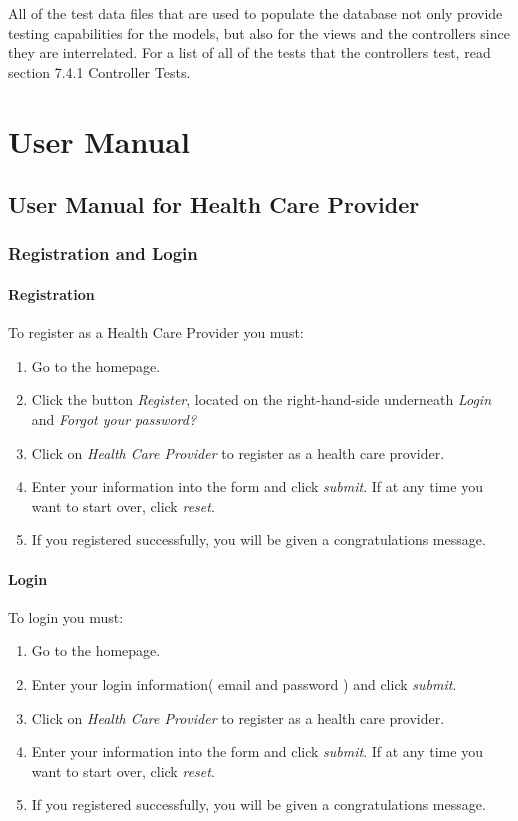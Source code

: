 \documentclass[12pt]{report}
\begin{document}
All of the test data files that are used to populate the database not only provide testing capabilities for the models, but also for the views and the controllers since they are interrelated.  For a list of all of the tests that the controllers test, read section 7.4.1 Controller Tests.


\part{User Manual}

\chapter{User Manual for Health Care Provider}
\section{Registration and Login}

\subsection{Registration}
To register as a Health Care Provider you must:
\begin{enumerate}
\item Go to the homepage.
\item Click the button \textit{Register}, located on the right-hand-side underneath \textit{Login} and \textit{Forgot your password?}
\item Click on \textit{Health Care Provider} to register as a health care provider.
\item Enter your information into the form and click \textit{submit}. If at any time you want to start over, click \textit{reset}.
\item If you registered successfully, you will be given a congratulations message.
\end{enumerate}

\subsection{Login}
To login you must:
\begin{enumerate}
\item Go to the homepage.
\item Enter your login information( email and password ) and click \textit{submit}.
\item Click on \textit{Health Care Provider} to register as a health care provider.
\item Enter your information into the form and click \textit{submit}. If at any time you want to start over, click \textit{reset}.
\item If you registered successfully, you will be given a congratulations message.
\end{enumerate}
\end{document}
